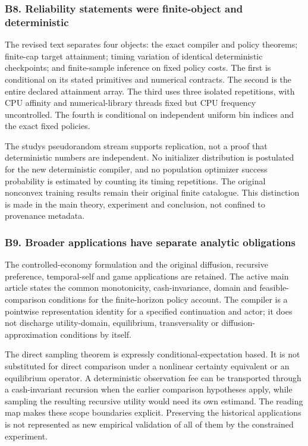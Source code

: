 \documentclass[ecta,nameyear,draft]{econsocart}
\begin{document}
\hypertarget{b8-reliability-statements-were-finite-object-and-deterministic}{%
\subsubsection{B8. Reliability statements were finite-object and
deterministic}\label{b8-reliability-statements-were-finite-object-and-deterministic}}

The revised text separates four objects: the exact compiler and policy
theorems; finite-cap target attainment; timing variation of identical
deterministic checkpoints; and finite-sample inference on fixed policy
costs. The first is conditional on its stated primitives and numerical
contracts. The second is the entire declared attainment array. The third
uses three isolated repetitions, with CPU affinity and numerical-library
threads fixed but CPU frequency uncontrolled. The fourth is conditional
on independent uniform bin indices and the exact fixed policies.

The study\textquotesingle s pseudorandom stream supports replication,
not a proof that deterministic numbers are independent. No initializer
distribution is postulated for the new deterministic compiler, and no
population optimizer success probability is estimated by counting its
timing repetitions. The original nonconvex training results remain their
original finite catalogue. This distinction is made in the main theory,
experiment and conclusion, not confined to provenance metadata.

\hypertarget{b9-broader-applications-have-separate-analytic-obligations}{%
\subsubsection{B9. Broader applications have separate analytic
obligations}\label{b9-broader-applications-have-separate-analytic-obligations}}

The controlled-economy formulation and the original diffusion, recursive
preference, temporal-self and game applications are retained. The active
main article states the common monotonicity, cash-invariance, domain and
feasible-comparison conditions for the finite-horizon policy account.
The compiler is a pointwise representation identity for a specified
continuation and actor; it does not discharge utility-domain,
equilibrium, transversality or diffusion-approximation conditions by
itself.

The direct sampling theorem is expressly conditional-expectation based.
It is not substituted for direct comparison under a nonlinear certainty
equivalent or an equilibrium operator. A deterministic observation fee
can be transported through a cash-invariant recursion when the earlier
comparison hypotheses apply, while sampling the resulting recursive
utility would need its own estimand. The reading map makes these scope
boundaries explicit. Preserving the historical applications is not
represented as new empirical validation of all of them by the
constrained experiment.
\end{document}
